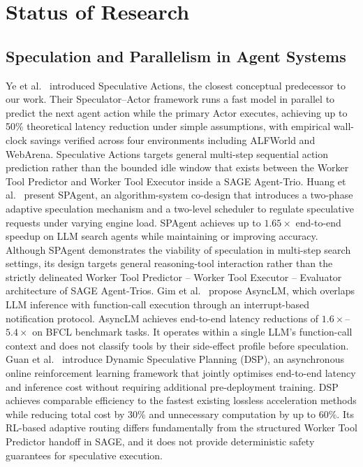 \documentclass[conference]{IEEEtran}
\begin{document}
\section{Status of Research}
\subsection{Speculation and Parallelism in Agent Systems}
Ye et al.~\cite{ye2025speculative} introduced Speculative Actions, the closest
conceptual predecessor to our work.
Their Speculator--Actor framework runs a fast model in parallel to predict the
next agent action while the primary Actor executes, achieving up to 50\%
theoretical latency reduction under simple assumptions, with empirical
wall-clock savings verified across four environments including ALFWorld and
WebArena.
Speculative Actions targets general multi-step sequential action prediction
rather than the bounded idle window that exists between the Worker Tool
Predictor and Worker Tool Executor inside a SAGE Agent-Trio.
Huang et al.~\cite{huang2025spagent} present SPAgent, an algorithm-system
co-design that introduces a two-phase adaptive speculation mechanism and a
two-level scheduler to regulate speculative requests under varying engine load.
SPAgent achieves up to $1.65\times$ end-to-end speedup on LLM search agents
while maintaining or improving accuracy.
Although SPAgent demonstrates the viability of speculation in multi-step search
settings, its design targets general reasoning-tool interaction rather than the
strictly delineated Worker Tool Predictor -- Worker Tool Executor -- Evaluator
architecture of SAGE Agent-Trios.
Gim et al.~\cite{gim2024asynclm} propose AsyncLM, which overlaps LLM inference
with function-call execution through an interrupt-based notification protocol.
AsyncLM achieves end-to-end latency reductions of $1.6\times$--$5.4\times$ on
BFCL benchmark tasks.
It operates within a single LLM's function-call context and does not classify
tools by their side-effect profile before speculation.
Guan et al.~\cite{guan2025dsp} introduce Dynamic Speculative Planning (DSP), an
asynchronous online reinforcement learning framework that jointly optimises
end-to-end latency and inference cost without requiring additional pre-deployment
training.
DSP achieves comparable efficiency to the fastest existing lossless acceleration
methods while reducing total cost by 30\% and unnecessary computation by up to
60\%.
Its RL-based adaptive routing differs fundamentally from the structured Worker
Tool Predictor handoff in SAGE, and it does not provide deterministic safety
guarantees for speculative execution.
\end{document}
